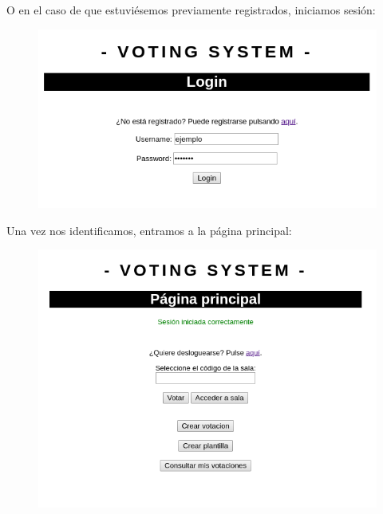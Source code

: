 \documentclass{article}
\begin{document}
 	O en el caso de que estuviésemos previamente registrados, iniciamos sesión:
 	\begin{figure}[H]
 		\centering
 		\includegraphics[totalheight=5.7cm]{img/cap7}
 		\caption{}
 	\end{figure}
 	\newpage
 	Una vez nos identificamos, entramos a la página principal:
 	\begin{figure}[H]
 		\centering
 		\includegraphics[totalheight=6.6cm]{img/cap8}
 		\caption{}
 	\end{figure}
 
\end{document}
